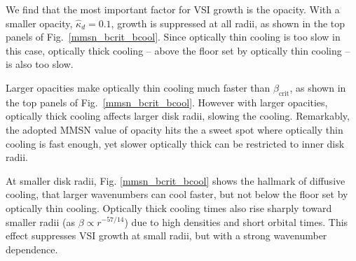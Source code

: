 We find that the most important factor for VSI growth is the opacity.  With a smaller opacity, $\hat{\kappa}_d = 0.1$, growth is suppressed at all radii, as shown in the top panels of Fig.\ \ref{mmsn_bcrit_bcool}.  Since optically thin cooling is too slow in this case, optically thick cooling -- above the floor set by optically thin cooling -- is also too slow.  

Larger opacities make optically thin cooling much faster than $\beta_\mathrm{crit}$, as shown in the top panels of Fig.\ \ref{mmsn_bcrit_bcool}.  However with larger opacities, optically thick cooling affects larger disk radii, slowing the cooling.  Remarkably, the adopted MMSN value of opacity hits the a sweet spot where optically thin cooling is fast enough, yet slower optically thick can be restricted to inner disk radii.

At smaller disk radii,  Fig. \ref{mmsn_bcrit_bcool} shows the hallmark of diffusive cooling, that larger wavenumbers can cool faster, but not below the floor set by optically thin cooling.  Optically thick cooling times also rise sharply toward smaller radii (as $\beta \propto r^{-57/14}$) due to high densities and short orbital times.  This effect suppresses VSI growth at small radii, but with a strong wavenumber dependence. 



